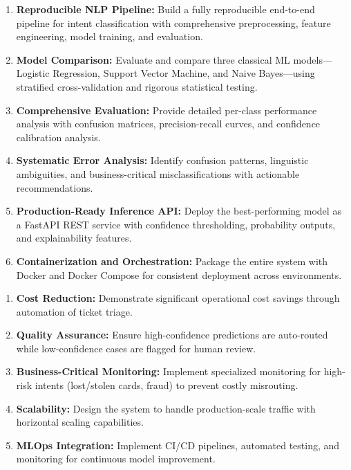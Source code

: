 \documentclass[12pt,a4paper]{article}
\begin{document}
\begin{archbox}
\begin{enumerate}[leftmargin=*]
    \item \textbf{Reproducible NLP Pipeline:} Build a fully reproducible end-to-end pipeline for intent classification with comprehensive preprocessing, feature engineering, model training, and evaluation.
    \item \textbf{Model Comparison:} Evaluate and compare three classical ML models---Logistic Regression, Support Vector Machine, and Naive Bayes---using stratified cross-validation and rigorous statistical testing.
    \item \textbf{Comprehensive Evaluation:} Provide detailed per-class performance analysis with confusion matrices, precision-recall curves, and confidence calibration analysis.
    \item \textbf{Systematic Error Analysis:} Identify confusion patterns, linguistic ambiguities, and business-critical misclassifications with actionable recommendations.
    \item \textbf{Production-Ready Inference API:} Deploy the best-performing model as a FastAPI REST service with confidence thresholding, probability outputs, and explainability features.
    \item \textbf{Containerization and Orchestration:} Package the entire system with Docker and Docker Compose for consistent deployment across environments.
\end{enumerate}
\end{archbox}

\begin{archbox}
\begin{enumerate}[leftmargin=*]
    \item \textbf{Cost Reduction:} Demonstrate significant operational cost savings through automation of ticket triage.
    \item \textbf{Quality Assurance:} Ensure high-confidence predictions are auto-routed while low-confidence cases are flagged for human review.
    \item \textbf{Business-Critical Monitoring:} Implement specialized monitoring for high-risk intents (lost/stolen cards, fraud) to prevent costly misrouting.
    \item \textbf{Scalability:} Design the system to handle production-scale traffic with horizontal scaling capabilities.
    \item \textbf{MLOps Integration:} Implement CI/CD pipelines, automated testing, and monitoring for continuous model improvement.
\end{enumerate}
\end{archbox}
\end{document}

